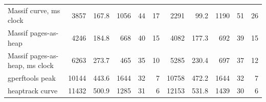 \begin{tabular}{lrrrrrrrrrr}
Massif curve, ms clock & 3857 & 167.8 & 1056 & 44 & 17 & 2291 & 99.2 & 1190 & 51 & 26 \\
Massif pages-as-heap & 4246 & 184.8 & 668 & 40 & 15 & 4082 & 177.3 & 692 & 39 & 15 \\
Massif pages-as-heap, ms clock & 6263 & 273.7 & 465 & 35 & 10 & 5285 & 230.4 & 697 & 37 & 12 \\
gperftools peak & 10144 & 443.6 & 1644 & 32 & 7 & 10758 & 472.2 & 1644 & 32 & 7 \\
heaptrack curve & 11432 & 500.9 & 1285 & 31 & 6 & 12153 & 531.8 & 1439 & 30 & 6 \\
\bottomrule
\end{tabular}
